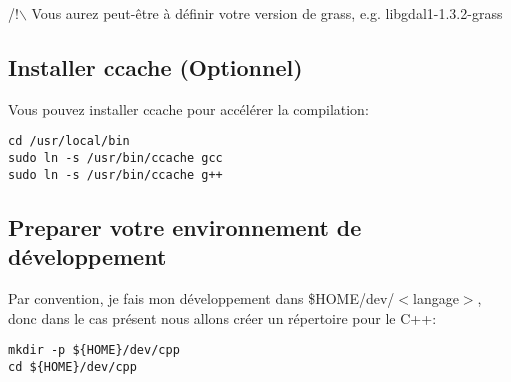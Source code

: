 /!$\backslash$ Vous aurez peut-\^etre \`a d\'efinir votre version de grass, e.g. libgdal1-1.3.2-grass

\subsection{Installer ccache (Optionnel)}
Vous pouvez installer ccache pour acc\'el\'erer la compilation:

\begin{verbatim}
cd /usr/local/bin 
sudo ln -s /usr/bin/ccache gcc 
sudo ln -s /usr/bin/ccache g++ 
\end{verbatim}


\subsection{Preparer votre environnement de d\'eveloppement}
Par convention, je fais mon d\'eveloppement dans \$HOME/dev/$<$langage$>$, donc dans le cas pr\'esent nous allons cr\'eer un r\'epertoire pour le C++:

\begin{verbatim}
mkdir -p ${HOME}/dev/cpp 
cd ${HOME}/dev/cpp 
\end{verbatim}

% 
% 
% 

